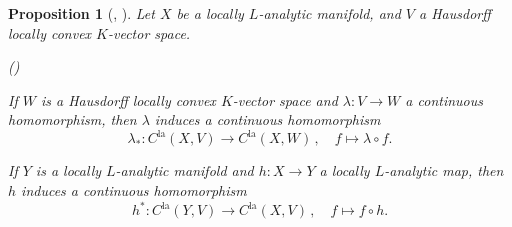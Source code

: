 \documentclass[a4paper, reqno, 10pt]{amsart}
\newtheorem{proposition}[theorem]{Proposition}
\theoremstyle{definition}
\newenvironment{altenumerate}
	{\begin{list}
		{\textup{(\theenumi)} }
		{\usecounter{enumi}
			\setlength{\labelwidth}{0pt}
			\setlength{\labelsep}{0pt}
			\setlength{\leftmargin}{0pt}
			\setlength{\itemsep}{0pt}
			\setlength{\topsep}{0pt}
		\renewcommand{\theenumi}{\roman{enumi}}
		}}
	{\end{list}}
\numberwithin{equation}{section}
\newcommand{\la}{{\mathrm{la}}}
\newcommand{\lra}{\longrightarrow}
\newcommand{\lto}{\longmapsto}
\newcommand{\ra}{\rightarrow}
\begin{document}
\begin{proposition}[{\cite[Bem.\ 2.1.11]{FeauxdeLacroix99TopDarstpAdischLieGrp}, \cite[p.\ 40]{Emerton17LocAnVect}}]\label{Prop 1 - Functorialities for the space of locally analytic functions}
	Let $X$ be a locally $L$-analytic manifold, and $V$ a Hausdorff locally convex $K$-vector space.
	\begin{altenumerate}
		\item
		If $W$ is a Hausdorff locally convex $K$-vector space and $\lambda \colon V \ra W$ a continuous homomorphism, then $\lambda$ induces a continuous homomorphism
		\begin{equation*}
			\lambda_\ast \colon C^\la(X,V) \lra C^\la(X,W) \,,\quad f \lto \lambda \circ f .
		\end{equation*}
		\item
		If $Y$ is a locally $L$-analytic manifold and $h \colon X \ra Y$ a locally $L$-analytic map, then $h$ induces a continuous homomorphism
		\begin{equation*}
			h^\ast \colon C^\la(Y,V) \lra C^\la(X,V) \,,\quad f \lto f \circ h .
		\end{equation*}
	\end{altenumerate}
\end{proposition}
\end{document}
